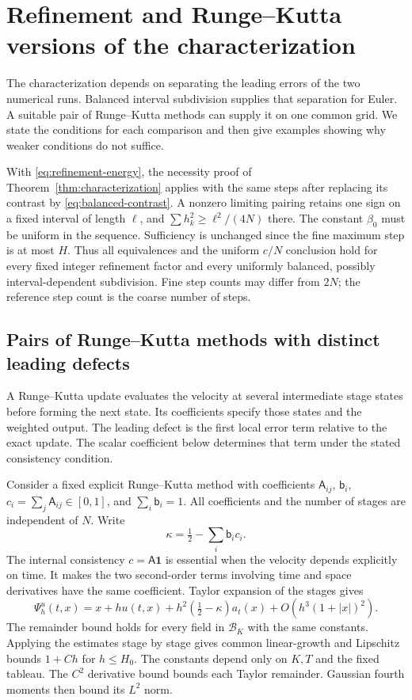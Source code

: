 \section{Refinement and Runge--Kutta versions of the characterization}
\label{app:scheme-extension}
The characterization depends on separating the leading errors of the two
numerical runs. Balanced interval subdivision supplies that separation for
Euler. A suitable pair of Runge--Kutta methods can supply it on one common
grid. We state the conditions for each comparison and then give examples
showing why weaker conditions do not suffice.\AIassistance

With \eqref{eq:refinement-energy}, the necessity proof of
Theorem~\ref{thm:characterization} applies with the same steps after replacing its
contrast by \eqref{eq:balanced-contrast}. A nonzero limiting pairing
retains one sign on a fixed interval of length $\ell$, and $\sum h_k^2\ge\ell^2/(4N)$ there.
The constant $\beta_0$ must be uniform in the sequence. Sufficiency is
unchanged since the fine maximum step is at most $H$.
Thus all equivalences and the uniform $c/N$ conclusion hold for every
fixed integer refinement factor and every uniformly balanced, possibly
interval-dependent subdivision. Fine step counts may differ from $2N$;
the reference step count is the coarse number of steps.

\subsection{Pairs of Runge--Kutta methods with distinct leading defects}
A Runge--Kutta update evaluates the velocity at several intermediate stage
states before forming the next state. Its coefficients specify those states
and the weighted output. The leading defect is the first local error term
relative to the exact update. The scalar coefficient below determines that
term under the stated consistency condition.

Consider a fixed explicit Runge--Kutta method with coefficients
$\mathsf A_{ij}$, $\mathsf b_i$, $c_i=\sum_j \mathsf A_{ij}\in[0,1]$, and $\sum_i \mathsf b_i=1$.
All coefficients and the number of stages are independent of $N$.
Write
\[
 \kappa=\tfrac12-\sum_i \mathsf b_ic_i.
\]
The internal consistency $c=\mathsf A\mathbf1$ is essential when the
velocity depends explicitly on time. It makes the two second-order terms
involving time and space derivatives have the same coefficient.
Taylor expansion of the stages gives
\begin{equation}
 \Psi_h^u(t,x)=x+hu(t,x)+h^2(\tfrac12-\kappa)a_t(x)
                 +O(h^3(1+|x|)^2).
 \label{eq:rk-leading-defect}
\end{equation}
The remainder bound holds for every field in $\mathcal B_K$ with the same
constants. Applying the estimates stage by stage gives common linear-growth
and Lipschitz bounds $1+Ch$ for $h\le H_0$. The constants depend only on
$K,T$ and the fixed tableau. The $C^2$ derivative bound bounds each
Taylor remainder. Gaussian fourth moments then bound its $L^2$ norm.

